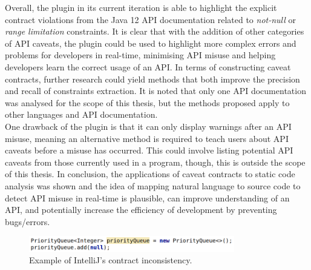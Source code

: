 Overall, the plugin in its current iteration is able to highlight the explicit contract violations from the Java 12 API documentation related to \textit{not-null} or \textit{range limitation} constraints. It is clear that with the addition of other categories of API caveats, the plugin could be used to highlight more complex errors and problems for developers in real-time, minimising API misuse and helping developers learn the correct usage of an API. In terms of constructing caveat contracts, further research could yield methods that both improve the precision and recall of constraints extraction. It is noted that only one API documentation was analysed for the scope of this thesis, but the methods proposed apply to other languages and API documentation. \\
One drawback of the plugin is that it can only display warnings after an API misuse, meaning an alternative method is required to teach users about API caveats before a misuse has occurred. This could involve listing potential API caveats from those currently used in a program, though, this is outside the scope of this thesis. In conclusion, the applications of caveat contracts to static code analysis was shown and the idea of mapping natural language to source code to detect API misuse in real-time is plausible, can improve understanding of an API, and potentially increase the efficiency of development by preventing bugs/errors.

\begin{figure}[h]
	\label{fig:intellij-inspection-off}
	\centering
	\includegraphics[width=0.8\textwidth]{figs/intellij-inspection-off.png}
	\caption{Example of IntelliJ's contract inconsistency.}
\end{figure}

